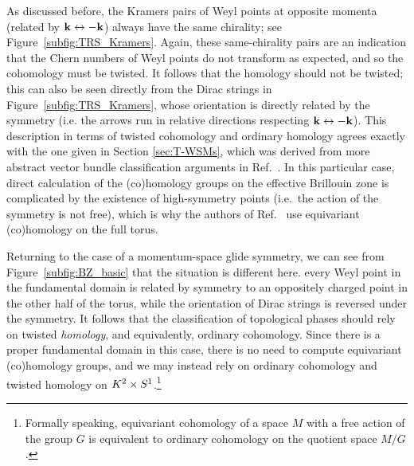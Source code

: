 As discussed before,  the Kramers pairs of Weyl points at opposite momenta (related by $\vb{k}\leftrightarrow -\vb{k}$) always have the same chirality; see Figure~\ref{subfig:TRS_Kramers}.  %
Again, these same-chirality pairs are an indication that the Chern numbers of Weyl points do not transform as expected, and so the cohomology must be twisted. It follows that the homology should not be twisted; this can also be seen directly from the Dirac strings in Figure~\ref{subfig:TRS_Kramers}, whose orientation is directly related by the symmetry (i.e. the arrows run in relative directions respecting $\vb{k}\leftrightarrow-\vb{k}$). This description in terms of twisted cohomology and ordinary homology agrees exactly with the one given in Section \ref{sec:T-WSMs}, which was derived from more abstract vector bundle classification arguments in Ref.~\cite{Thiang_equivariant}. In this particular case, direct calculation of the (co)homology groups on the effective Brillouin zone is complicated by the existence of high-symmetry points (i.e.\ the action of the symmetry is not free), which is why the authors of Ref.~\cite{Thiang_equivariant} use equivariant (co)homology on the full torus.

Returning to the case of a momentum-space glide symmetry, we can see from Figure~\ref{subfig:BZ_basic} that the situation is different here.  every Weyl point in the fundamental domain is related by symmetry to an oppositely charged point in the other half of the torus, while the orientation of Dirac strings is reversed under the symmetry. It follows that the classification of topological phases should rely on twisted \emph{homology}, and equivalently, ordinary cohomology. Since there is a proper fundamental domain in this case, there is no need to compute equivariant (co)homology groups, and we may instead rely on ordinary cohomology and twisted homology on $K^2\times S^1$.\footnote{\label{ft:eq_cohom}
	Formally speaking, equivariant cohomology of a space $M$ with a free action of the group $G$ is equivalent to ordinary cohomology on the quotient space $M/G$ \parencite[Corollary 9.6]{Tu_equivariant}.}

